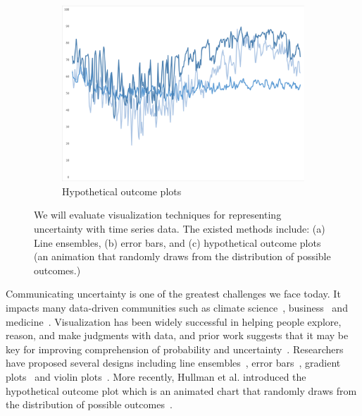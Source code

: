 \begin{figure}[t!]
\begin{subfigure}[t]{.3\columnwidth}
		\includegraphics[width=\columnwidth]{images/hops}
		\caption{Hypothetical outcome plots}
	\end{subfigure}
	\caption{We will evaluate visualization techniques for representing uncertainty with time series data. The existed methods include: (a) Line ensembles, (b) error bars, and (c) hypothetical outcome plots~\cite{hullman2015hypothetical}  (an animation that randomly draws from the distribution of possible outcomes.) }
	\label{fig:uncertainty}
\end{figure}


Communicating uncertainty is one of the greatest challenges we face today.
It impacts many data-driven communities such as climate science~\cite{brodlie2012review,pothkow2011probabilistic,potter2009ensemble,spiegelhalter2011visualizing}, business~\cite{griethe2005visualizing,rodriguez2010toward} and medicine~\cite{han2011varieties,han2011communication,kniss2005statistically,lundstrom2007uncertainty,politi2007communicating,prassni2010uncertainty,spiegelhalter2011visualizing}. 
Visualization has been widely successful in helping people explore, reason, and make judgments with data, and prior work suggests that it may be key for improving comprehension of probability and uncertainty~\cite{correll2014error,brodlie2012review,pothkow2011probabilistic,sanyal2009user,sanyal2010noodles,spiegelhalter2011visualizing}. Researchers have proposed several designs including line ensembles~\cite{potter2009ensemble,sanyal2010noodles}, error bars~\cite{correll2014error}, gradient plots~\cite{correll2014error,han2011communication,jackson2008displaying,tak2014perception} and violin plots~\cite{correll2014error,hintze1998violin,kampstra2008beanplot}. 
More recently, Hullman et al. introduced the hypothetical outcome plot which is an animated chart that randomly draws from the distribution of possible outcomes~\cite{hullman2015hypothetical}. 

